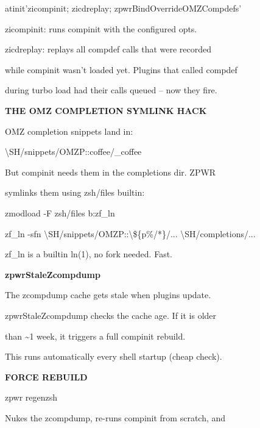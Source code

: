 \documentclass[11pt,a4paper,twoside]{book}
\begin{document}
\begin{codebox}
atinit'zicompinit; zicdreplay; zpwrBindOverrideOMZCompdefs'\\
\end{codebox}

zicompinit: runs compinit with the configured opts.

zicdreplay: replays all compdef calls that were recorded

while compinit wasn't loaded yet. Plugins that called compdef

during turbo load had their calls queued -- now they fire.


\vspace{12pt}
{\bfseries\color{neonyellow} THE OMZ COMPLETION SYMLINK HACK}\vspace{4pt}

OMZ completion snippets land in:

\textbackslash{}SH/snippets/OMZP::coffee/\_coffee

But compinit needs them in the completions dir. ZPWR

symlinks them using zsh/files builtin:

zmodload -F zsh/files b:zf\_ln

zf\_ln -sfn \textbackslash{}SH/snippets/OMZP::\textbackslash{}\$\{p\%/*\}/... \textbackslash{}SH/completions/...

zf\_ln is a builtin ln(1), no fork needed. Fast.


\vspace{12pt}
{\bfseries\color{neonyellow} zpwrStaleZcompdump}\vspace{4pt}

The zcompdump cache gets stale when plugins update.

zpwrStaleZcompdump checks the cache age. If it is older

than \textasciitilde{}1 week, it triggers a full compinit rebuild.

This runs automatically every shell startup (cheap check).


\vspace{12pt}
{\bfseries\color{neonyellow} FORCE REBUILD}\vspace{4pt}

\begin{codebox}
zpwr regenzsh\\
\end{codebox}

Nukes the zcompdump, re-runs compinit from scratch, and
\end{document}
